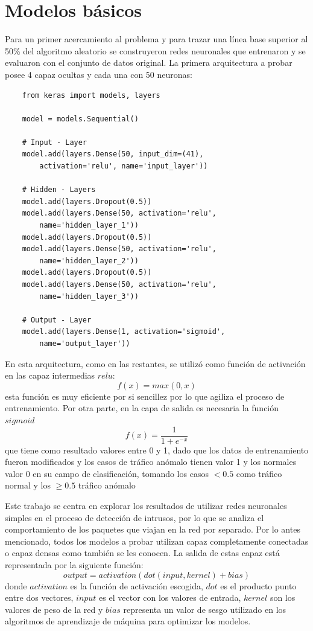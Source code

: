 \section{Modelos básicos}
Para un primer acercamiento al problema y para trazar una línea base superior al 50\% del algoritmo aleatorio se construyeron redes neuronales que entrenaron y se evaluaron con el conjunto de datos original. La primera arquitectura a probar posee 4 capaz ocultas y cada una con 50 neuronas:
\begin{verbatim}
    from keras import models, layers

    model = models.Sequential()

    # Input - Layer
    model.add(layers.Dense(50, input_dim=(41), 
        activation='relu', name='input_layer'))

    # Hidden - Layers
    model.add(layers.Dropout(0.5))
    model.add(layers.Dense(50, activation='relu', 
        name='hidden_layer_1'))
    model.add(layers.Dropout(0.5))
    model.add(layers.Dense(50, activation='relu', 
        name='hidden_layer_2'))
    model.add(layers.Dropout(0.5))
    model.add(layers.Dense(50, activation='relu', 
        name='hidden_layer_3'))

    # Output - Layer
    model.add(layers.Dense(1, activation='sigmoid', 
        name='output_layer'))
\end{verbatim}

En esta arquitectura, como en las restantes, se utilizó como función de activación en las capaz intermedias $relu$:
\[f(x)=max(0,x)\]
esta función es muy eficiente por si sencillez por lo que agiliza el proceso de entrenamiento. Por otra parte, en la capa de salida es necesaria la función $sigmoid$
\[f(x) = \frac{1}{1 + e^{-x}}\]
que tiene como resultado valores entre 0 y 1, dado que los datos de entrenamiento fueron modificados y los casos de tráfico anómalo tienen valor 1 y los normales valor 0 en su campo de clasificación, tomando los casos $< 0.5$ como tráfico normal y los $\geq 0.5$ tráfico anómalo

Este trabajo se centra en explorar los resultados de utilizar redes neuronales simples en el proceso de detección de intrusos, por lo que se analiza el comportamiento de los paquetes que viajan en la red por separado. Por lo antes mencionado, todos los modelos a probar utilizan capaz completamente conectadas o capaz densas como también se les conocen. La salida de estas capaz está representada por la siguiente función:
\[output = activation(dot(input, kernel) + bias)\]
donde $activation$ es la función de activación escogida, $dot$ es el producto punto entre dos vectores, $input$ es el vector con los valores de entrada, $kernel$ son los valores de peso de la red y $bias$ representa un valor de sesgo utilizado en los algoritmos de aprendizaje de máquina para optimizar los modelos.

